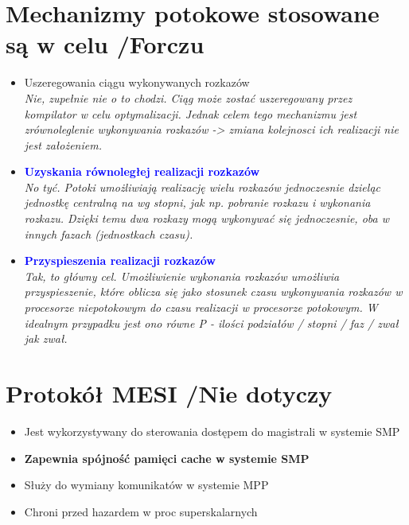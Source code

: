 \section{Mechanizmy potokowe stosowane są w celu {\small /Forczu}}
	\begin{itemize}
    \item Uszeregowania ciągu wykonywanych rozkazów\\
    {\small \emph{Nie, zupełnie nie o to chodzi. Ciąg może zostać uszeregowany przez kompilator w celu optymalizacji. Jednak celem tego mechanizmu jest zrównoleglenie wykonywania rozkazów -> zmiana kolejnosci ich realizacji nie jest założeniem.}}
    \item \textcolor{Blue}{\textbf{Uzyskania równoległej realizacji rozkazów}}\\
    {\small \emph{No tyć. Potoki umożliwiają realizację wielu rozkazów jednoczesnie dzieląc jednostkę centralną na wg stopni, jak np. pobranie rozkazu i wykonania rozkazu. Dzięki temu dwa rozkazy mogą wykonywać się jednoczesnie, oba w innych fazach (jednostkach czasu).}}
    \item \textcolor{Blue}{\textbf{Przyspieszenia realizacji rozkazów}}\\
    {\small \emph{Tak, to główny cel. Umożliwienie wykonania rozkazów umożliwia przyspieszenie, które oblicza się jako stosunek czasu wykonywania rozkazów w procesorze niepotokowym do czasu realizacji w procesorze potokowym. W idealnym przypadku jest ono równe \emph{P} - ilości podziałów / stopni / faz / zwał jak zwał.}}
    \end{itemize}

\section{Protokół MESI {\small /Nie dotyczy}}
	\begin{itemize}
    \item Jest wykorzystywany do sterowania dostępem do magistrali w systemie SMP
    \item \textbf{Zapewnia spójność pamięci cache w systemie SMP}
    \item Służy do wymiany komunikatów w systemie MPP
    \item Chroni przed hazardem w proc superskalarnych
    \end{itemize}
    
